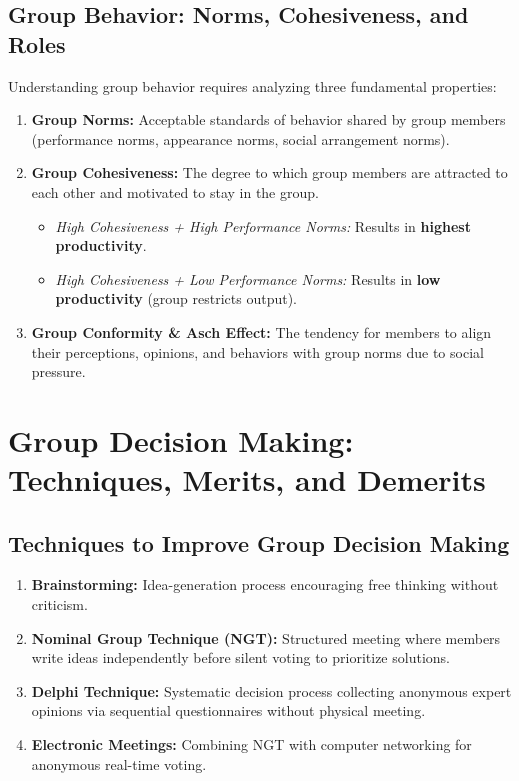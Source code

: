 \documentclass[12pt,a4paper]{article}
\begin{document}
\subsection{Group Behavior: Norms, Cohesiveness, and Roles}
Understanding group behavior requires analyzing three fundamental properties:
\begin{enumerate}[leftmargin=*, itemsep=4pt]
  \item \textbf{Group Norms:} Acceptable standards of behavior shared by group members (performance norms, appearance norms, social arrangement norms).
  \item \textbf{Group Cohesiveness:} The degree to which group members are attracted to each other and motivated to stay in the group.
    \begin{itemize}[leftmargin=*, noitemsep]
      \item \textit{High Cohesiveness + High Performance Norms:} Results in \textbf{highest productivity}.
      \item \textit{High Cohesiveness + Low Performance Norms:} Results in \textbf{low productivity} (group restricts output).
    \end{itemize}
  \item \textbf{Group Conformity \& Asch Effect:} The tendency for members to align their perceptions, opinions, and behaviors with group norms due to social pressure.
\end{enumerate}

\section{Group Decision Making: Techniques, Merits, and Demerits}

\subsection{Techniques to Improve Group Decision Making}
\begin{enumerate}[leftmargin=*, itemsep=4pt]
  \item \textbf{Brainstorming:} Idea-generation process encouraging free thinking without criticism.
  \item \textbf{Nominal Group Technique (NGT):} Structured meeting where members write ideas independently before silent voting to prioritize solutions.
  \item \textbf{Delphi Technique:} Systematic decision process collecting anonymous expert opinions via sequential questionnaires without physical meeting.
  \item \textbf{Electronic Meetings:} Combining NGT with computer networking for anonymous real-time voting.
\end{enumerate}
\end{document}
